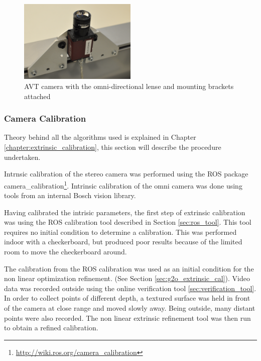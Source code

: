 
\begin{figure}[h]
  \centering
    \includegraphics[width=0.5\textwidth]{chapters/images/omni_cam_image}
  \caption{AVT camera with the omni-directional lense and mounting brackets attached}
\end{figure}

\subsubsection{Camera Calibration}

Theory behind all the algorithms used is explained in Chapter \ref{chapter:extrinsic_calibration}, this section will describe the procedure undertaken.  

Intrnsic calibration of the stereo camera was performed using the ROS package camera\_calibration\footnote{\url{http://wiki.ros.org/camera_calibration}}.  Intrinsic calibration of the omni camera was done using tools from an internal Bosch vision library.

Having calibrated the intrisic parameters, the first step of extrinsic calibration was using the ROS calibration tool described in Section \ref{sec:ros_tool}.  This tool requires no initial condition to determine a calibration.  This was performed indoor with a checkerboard, but produced poor results because of the limited room to move the checkerboard around.

The calibration from the ROS calibration was used as an initial condition for the non linear optimization refinement. (See Section \ref{sec:g2o_extrinsic_cal}).  Video data was recorded outside using the online verification tool \ref{sec:verification_tool}.  In order to collect points of different depth, a textured surface was held in front of the camera at close range and moved slowly away.  Being outside, many distant points were also recorded.  The non linear extrinsic refinement tool was then run to obtain a refined calibration.   


